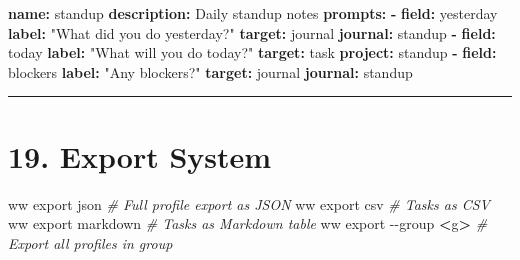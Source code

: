 \documentclass[
]{article}
\newenvironment{Shaded}{\begin{snugshade}}{\end{snugshade}}
\newcommand{\AttributeTok}[1]{\textcolor[rgb]{0.13,0.29,0.53}{#1}}
\newcommand{\CommentTok}[1]{\textcolor[rgb]{0.56,0.35,0.01}{\textit{#1}}}
\newcommand{\ExtensionTok}[1]{#1}
\newcommand{\FunctionTok}[1]{\textcolor[rgb]{0.13,0.29,0.53}{\textbf{#1}}}
\newcommand{\KeywordTok}[1]{\textcolor[rgb]{0.13,0.29,0.53}{\textbf{#1}}}
\newcommand{\NormalTok}[1]{#1}
\newcommand{\OperatorTok}[1]{\textcolor[rgb]{0.81,0.36,0.00}{\textbf{#1}}}
\newcommand{\StringTok}[1]{\textcolor[rgb]{0.31,0.60,0.02}{#1}}
\begin{document}
\begin{Shaded}
\begin{Highlighting}[]
\FunctionTok{name}\KeywordTok{:}\AttributeTok{ standup}
\FunctionTok{description}\KeywordTok{:}\AttributeTok{ Daily standup notes}
\FunctionTok{prompts}\KeywordTok{:}
\AttributeTok{  }\KeywordTok{{-}}\AttributeTok{ }\FunctionTok{field}\KeywordTok{:}\AttributeTok{ yesterday}
\AttributeTok{    }\FunctionTok{label}\KeywordTok{:}\AttributeTok{ }\StringTok{"What did you do yesterday?"}
\AttributeTok{    }\FunctionTok{target}\KeywordTok{:}\AttributeTok{ journal}
\AttributeTok{    }\FunctionTok{journal}\KeywordTok{:}\AttributeTok{ standup}
\AttributeTok{  }\KeywordTok{{-}}\AttributeTok{ }\FunctionTok{field}\KeywordTok{:}\AttributeTok{ today}
\AttributeTok{    }\FunctionTok{label}\KeywordTok{:}\AttributeTok{ }\StringTok{"What will you do today?"}
\AttributeTok{    }\FunctionTok{target}\KeywordTok{:}\AttributeTok{ task}
\AttributeTok{    }\FunctionTok{project}\KeywordTok{:}\AttributeTok{ standup}
\AttributeTok{  }\KeywordTok{{-}}\AttributeTok{ }\FunctionTok{field}\KeywordTok{:}\AttributeTok{ blockers}
\AttributeTok{    }\FunctionTok{label}\KeywordTok{:}\AttributeTok{ }\StringTok{"Any blockers?"}
\AttributeTok{    }\FunctionTok{target}\KeywordTok{:}\AttributeTok{ journal}
\AttributeTok{    }\FunctionTok{journal}\KeywordTok{:}\AttributeTok{ standup}
\end{Highlighting}
\end{Shaded}

\begin{center}\rule{0.5\linewidth}{0.5pt}\end{center}

\section{19. Export System}\label{export-system}

\begin{Shaded}
\begin{Highlighting}[]
\ExtensionTok{ww}\NormalTok{ export json          }\CommentTok{\# Full profile export as JSON}
\ExtensionTok{ww}\NormalTok{ export csv           }\CommentTok{\# Tasks as CSV}
\ExtensionTok{ww}\NormalTok{ export markdown      }\CommentTok{\# Tasks as Markdown table}
\ExtensionTok{ww}\NormalTok{ export }\AttributeTok{{-}{-}group} \OperatorTok{\textless{}}\NormalTok{g}\OperatorTok{\textgreater{}}   \CommentTok{\# Export all profiles in group}
\end{Highlighting}
\end{Shaded}
\end{document}
